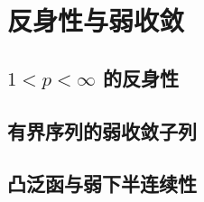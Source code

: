 \section{反身性与弱收敛}
\label{b1:sec:1004}


\subsection{\texorpdfstring{\(1<p<\infty\)}{1<p<∞} 的反身性}
\label{b1:subsec:100401}

\subsection{有界序列的弱收敛子列}
\label{b1:subsec:100402}

\subsection{凸泛函与弱下半连续性}
\label{b1:subsec:100403}


